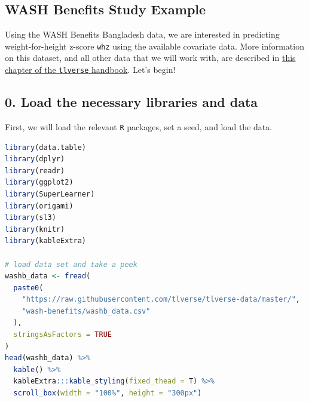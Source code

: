 \documentclass[
  12pt, krantz2,
]{krantz}
\newcommand{\passthrough}[1]{#1}
\newcommand{\1}{\mathbbm{1}}
\theoremstyle{definition}
\theoremstyle{definition}
\theoremstyle{definition}
\theoremstyle{definition}
\theoremstyle{remark}
\begin{document}
\hypertarget{wash-benefits-study-example-1}{%
\subsection*{WASH Benefits Study Example}\label{wash-benefits-study-example-1}}


Using the WASH Benefits Bangladesh data, we are interested in predicting
weight-for-height z-score \passthrough{\lstinline!whz!} using the available covariate data. More
information on this dataset, and all other data that we will work with, are
described in \href{ihttps://tlverse.org/tlverse-handbook/data.html}{this chapter of the \passthrough{\lstinline!tlverse!}
handbook}. Let's begin!

\hypertarget{load-the-necessary-libraries-and-data}{%
\subsection*{0. Load the necessary libraries and data}\label{load-the-necessary-libraries-and-data}}


First, we will load the relevant \passthrough{\lstinline!R!} packages, set a seed, and load the data.

\begin{lstlisting}[language=R]
library(data.table)
library(dplyr)
library(readr)
library(ggplot2)
library(SuperLearner)
library(origami)
library(sl3)
library(knitr)
library(kableExtra)

# load data set and take a peek
washb_data <- fread(
  paste0(
    "https://raw.githubusercontent.com/tlverse/tlverse-data/master/",
    "wash-benefits/washb_data.csv"
  ),
  stringsAsFactors = TRUE
)
head(washb_data) %>%
  kable() %>%
  kableExtra:::kable_styling(fixed_thead = T) %>%
  scroll_box(width = "100%", height = "300px")
\end{lstlisting}
\end{document}
